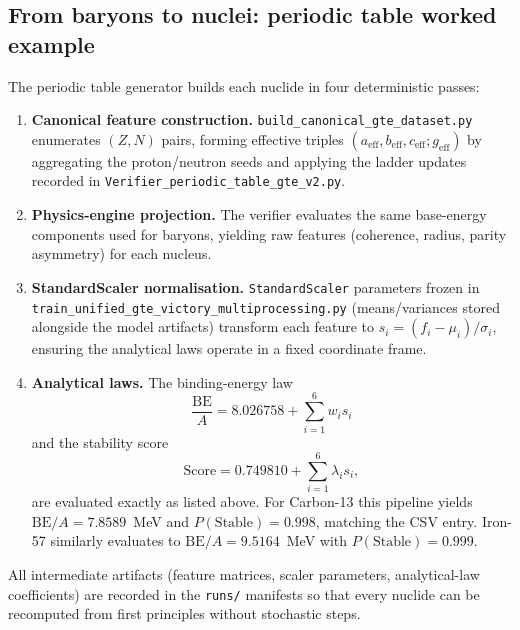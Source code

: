 \documentclass[9pt,twocolumn]{extarticle}
\begin{document}
\subsection{From baryons to nuclei: periodic table worked example}
The periodic table generator builds each nuclide in four deterministic passes:
\begin{enumerate}[leftmargin=1.4em,itemsep=0.2em]
  \item \textbf{Canonical feature construction.} \texttt{build\_canonical\_gte\_dataset.py} enumerates $(Z,N)$ pairs, forming effective triples $(a_{\mathrm{eff}},b_{\mathrm{eff}},c_{\mathrm{eff}};g_{\mathrm{eff}})$ by aggregating the proton/neutron seeds and applying the ladder updates recorded in \texttt{Verifier\_periodic\_table\_gte\_v2.py}.
  \item \textbf{Physics-engine projection.} The verifier evaluates the same base-energy components used for baryons, yielding raw features (coherence, radius, parity asymmetry) for each nucleus.
  \item \textbf{StandardScaler normalisation.} \texttt{StandardScaler} parameters frozen in \texttt{train\_unified\_gte\_victory\_\allowbreak multiprocessing.py} (means/variances stored alongside the model artifacts) transform each feature to $s_i = (f_i - \mu_i)/\sigma_i$, ensuring the analytical laws operate in a fixed coordinate frame.
  \item \textbf{Analytical laws.} The binding-energy law
        \[
        \frac{\mathrm{BE}}{A} = 8.026758 + \sum_{i=1}^{6} w_i s_i
        \]
        and the stability score
        \[
        \text{Score} = 0.749810 + \sum_{i=1}^6 \lambda_i s_i,
        \]
        are evaluated exactly as listed above. For Carbon-13 this pipeline yields $\mathrm{BE}/A = 7.8589$~MeV and $P(\text{Stable}) = 0.998$, matching the CSV entry. Iron-57 similarly evaluates to $\mathrm{BE}/A = 9.5164$~MeV with $P(\text{Stable}) = 0.999$.
\end{enumerate}
All intermediate artifacts (feature matrices, scaler parameters, analytical-law coefficients) are recorded in the \texttt{runs/} manifests so that every nuclide can be recomputed from first principles without stochastic steps.
\end{document}
